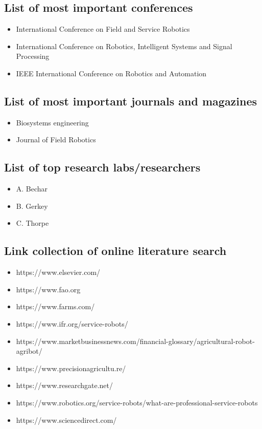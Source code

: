     \subsection{List of most important conferences}
    \begin{itemize}
        \item International Conference on Field and Service Robotics
        \item International Conference on Robotics, Intelligent Systems and Signal Processing
        \item IEEE International Conference on Robotics and Automation
    \end{itemize}
    \subsection{List of most important journals and magazines}
    \begin{itemize}
        \item Biosystems engineering
        \item Journal of Field Robotics
    \end{itemize}
    \subsection{List of top research labs/researchers}
    \begin{itemize}
        \item A. Bechar 
        \item B. Gerkey
        \item C. Thorpe 
    \end{itemize}
    \subsection{Link collection of online literature search}
    \begin{itemize}
        \item https://www.elsevier.com/
        \item https://www.fao.org
        \item https://www.farms.com/
        \item https://www.ifr.org/service-robots/
        \item https://www.marketbusinessnews.com/financial-glossary/agricultural-robot-agribot/
        \item https://www.precisionagricultu.re/
        \item https://www.researchgate.net/
        \item https://www.robotics.org/service-robots/what-are-professional-service-robots
        \item https://www.sciencedirect.com/
    \end{itemize}
